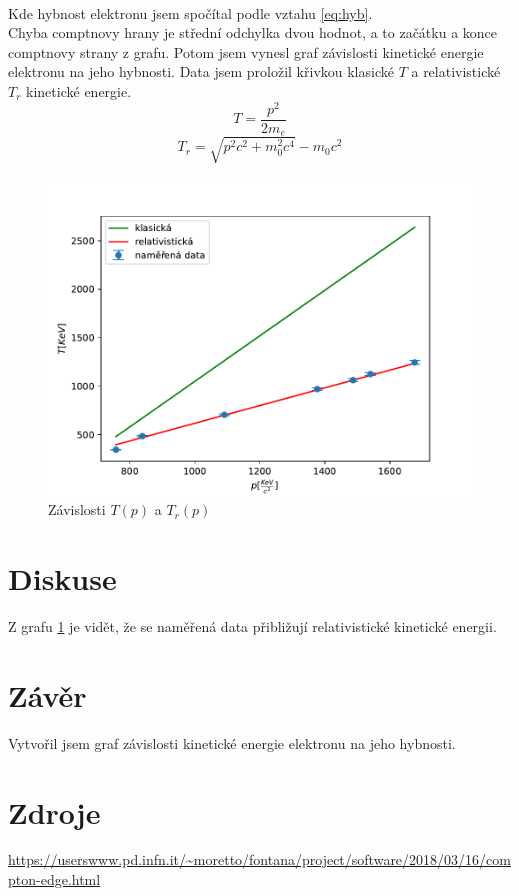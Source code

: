 \documentclass{article}
\begin{document}
\vspace{1em}
\\
Kde hybnost elektronu jsem spočítal podle vztahu \ref{eq:hyb}.\\
Chyba comptnovy hrany je střední odchylka dvou hodnot, a to začátku a konce comptnovy strany z grafu.
Potom jsem vynesl graf závislosti kinetické energie elektronu na jeho hybnosti.
Data jsem proložil křivkou klasické $T$ a relativistické $T_{r}$ kinetické energie.
$$T = \frac{p^{2}}{2m_{e}}$$
$$T_{r} = \sqrt{ p^{2}c^{2} + m_{0}^{2}c^{4} } - m_{0}c^{2}$$
\newpage
\begin{figure}[!h]
  \hspace*{-5em}
  \includegraphics[scale=1]{figs/fig1.pdf}
  \caption{Závislosti $T(p)$ a $T_{r}(p)$}
  \label{gf:tp}
\end{figure}
\section{Diskuse}
Z grafu \ref{gf:tp} je vidět, že se naměřená data přibližují relativistické kinetické energii.
\section{Závěr}
Vytvořil jsem graf závislosti kinetické energie elektronu na jeho hybnosti.
\section{Zdroje}
\url{
  https://userswww.pd.infn.it/~moretto/fontana/project/software/2018/03/16/compton-edge.html
  }
\end{document}
